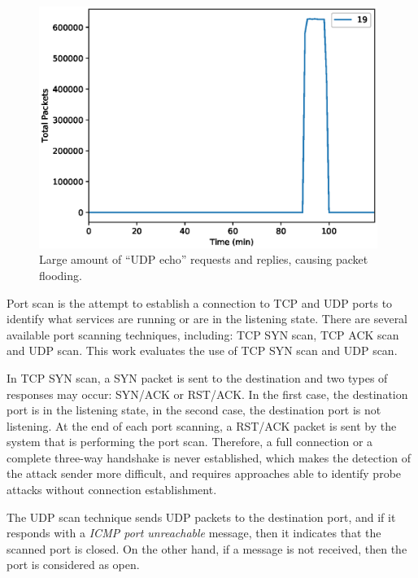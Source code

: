 \begin{figure}[h!]
     \centering 
     \includegraphics[width=11cm]{figures/ch2/fraggle_traffic.eps}
     \caption{Large amount of “UDP echo” requests and replies, causing packet flooding.}
     \label{fig:2.06}
\end{figure}

Port scan is the attempt to establish a connection to TCP and UDP ports to identify what services are running or are in the listening state. There are several available port scanning techniques, including: TCP SYN scan, TCP ACK scan and UDP scan. This work evaluates the use of TCP SYN scan and UDP scan. 

In TCP SYN scan, a SYN packet is sent to the destination and two types of responses may occur: SYN/ACK or RST/ACK. In the first case, the destination port is in the listening state, in the second case, the destination port is not listening. At the end of each port scanning, a RST/ACK packet is sent by the system that is performing the port scan. Therefore, a full connection or a complete three-way handshake is never established, which makes the detection of the attack sender more difficult, and requires approaches able to identify probe attacks without connection establishment.

The UDP scan technique sends UDP packets to the destination port, and if it responds with a \emph{ICMP port unreachable} message, then it indicates that the scanned port is closed. On the other hand, if a message is not received, then the port is considered as open.

